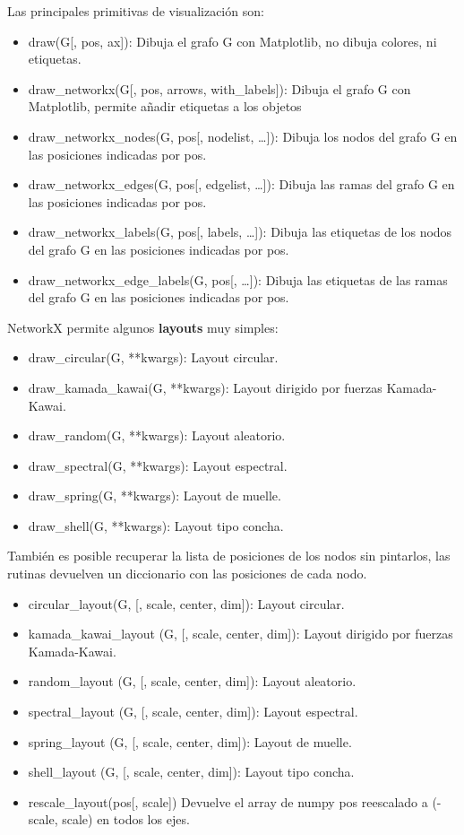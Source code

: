 Las principales primitivas de visualización son:
\begin{itemize}
\item draw(G[, pos, ax]): Dibuja el grafo G con Matplotlib, no dibuja colores, ni etiquetas.
\item draw\_networkx(G[, pos, arrows, with\_labels]): Dibuja el grafo G con Matplotlib, permite añadir etiquetas a los objetos
\item draw\_networkx\_nodes(G, pos[, nodelist, …]): Dibuja los nodos del grafo G en las posiciones indicadas por pos.
\item draw\_networkx\_edges(G, pos[, edgelist, …]): Dibuja las ramas del grafo G en las posiciones indicadas por pos.
\item draw\_networkx\_labels(G, pos[, labels, …]): Dibuja las etiquetas de los nodos del grafo G en las posiciones indicadas por pos.
\item draw\_networkx\_edge\_labels(G, pos[, …]): Dibuja las etiquetas de las ramas del grafo G en las posiciones indicadas por pos.
\end{itemize}

NetworkX permite algunos \textbf{layouts} muy simples:
\begin{itemize}
\item draw\_circular(G, **kwargs): Layout circular.
\item draw\_kamada\_kawai(G, **kwargs): Layout dirigido por fuerzas Kamada-Kawai.
\item draw\_random(G, **kwargs): Layout aleatorio.
\item draw\_spectral(G, **kwargs): Layout espectral.
\item draw\_spring(G, **kwargs): Layout de muelle.
\item draw\_shell(G, **kwargs): Layout tipo concha.
\end{itemize}

También es posible recuperar la lista de posiciones de los nodos sin pintarlos, las rutinas devuelven un diccionario con las posiciones de cada nodo.
\begin{itemize}
\item circular\_layout(G, [, scale, center, dim]): Layout circular.
\item kamada\_kawai\_layout (G, [, scale, center, dim]): Layout dirigido por fuerzas Kamada-Kawai.
\item random\_layout (G, [, scale, center, dim]): Layout aleatorio.
\item spectral\_layout (G, [, scale, center, dim]): Layout espectral.
\item spring\_layout (G, [, scale, center, dim]): Layout de muelle.
\item shell\_layout (G, [, scale, center, dim]): Layout tipo concha.
\item rescale\_layout(pos[, scale]) Devuelve el array de numpy pos reescalado a (-scale, scale) en todos los ejes.
\end{itemize}

